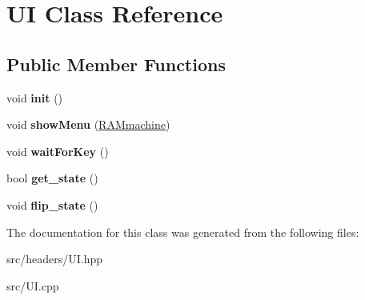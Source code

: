 \hypertarget{classUI}{\section{U\-I Class Reference}
\label{classUI}
}
\subsection*{Public Member Functions}
\begin{DoxyCompactItemize}
\item 
\hypertarget{classUI_a2277decc2cba013de2fbb5a64fbc1543}{void {\bfseries init} ()}\label{classUI_a2277decc2cba013de2fbb5a64fbc1543}

\item 
\hypertarget{classUI_af646695e4325c261eae00f466c43aef6}{void {\bfseries show\-Menu} (\hyperlink{classRAMmachine}{R\-A\-Mmachine})}\label{classUI_af646695e4325c261eae00f466c43aef6}

\item 
\hypertarget{classUI_ad929a7c850dcd2ff808f2c59be212f6a}{void {\bfseries wait\-For\-Key} ()}\label{classUI_ad929a7c850dcd2ff808f2c59be212f6a}

\item 
\hypertarget{classUI_a180b26436dec671d6808eb38ff39f323}{bool {\bfseries get\-\_\-state} ()}\label{classUI_a180b26436dec671d6808eb38ff39f323}

\item 
\hypertarget{classUI_a50a897f3829c3b61d1c7727dbb6d7679}{void {\bfseries flip\-\_\-state} ()}\label{classUI_a50a897f3829c3b61d1c7727dbb6d7679}

\end{DoxyCompactItemize}


The documentation for this class was generated from the following files\-:\begin{DoxyCompactItemize}
\item 
src/headers/U\-I.\-hpp\item 
src/U\-I.\-cpp\end{DoxyCompactItemize}
